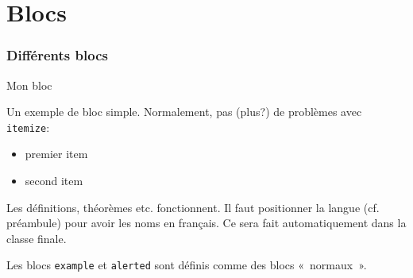 \documentclass{beamer}
\begin{document}
\section{Blocs}
\label{sec:blocs}

\begin{frame}
\frametitle{Différents blocs}

\vfill

\begin{block}{Mon bloc}

Un exemple de bloc simple. Normalement, pas (plus?) de problèmes avec
\texttt{itemize}:

\begin{itemize}
\item premier item
\item second item
\end{itemize}  
\end{block}

\vfill

\begin{definition}[Ma définition]
Les définitions, théorèmes etc. fonctionnent. Il faut positionner la
langue (cf. préambule) pour avoir les noms en français. Ce sera fait
automatiquement dans la classe finale.
\end{definition}

\vfill

\begin{example}
Les blocs \texttt{example} et \texttt{alerted} sont définis comme des
blocs «~normaux~».
\end{example}

\vfill


\end{frame}
\end{document}
